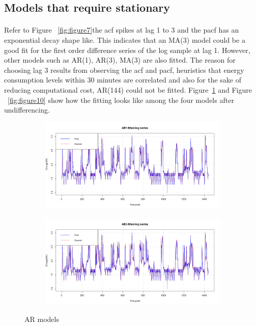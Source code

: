 \documentclass[12pt]{article}
\begin{document}
\subsection{Models that require stationary}
\paragraph{}
Refer to Figure ~\ref{fig:figure7}the acf spikes at lag 1 to 3 and the pacf has an exponential decay shape like. This indicates that an MA(3) model could be a good fit for the first order difference series of the log sample at lag 1. However, other models such as AR(1), AR(3), MA(3) are also fitted. The reason for choosing lag 3 results from observing the acf and pacf, heuristics that energy consumption levels within 30 minutes are correlated and also for the sake of reducing computational cost, AR(144) could not be fitted. Figure~\ref{fig:figure9}  and Figure ~\ref{fig:figure10}  show how the fitting looks like among the four models after undifferencing.
\begin{figure}[H]
  \centering
  \begin{subfigure}[b]{0.9\linewidth}
    \includegraphics[width=\linewidth]{figure9-1.png}
  \end{subfigure}
  \begin{subfigure}[b]{0.9\linewidth}
    \includegraphics[width=\linewidth]{figure9-2.png}
  \end{subfigure}
  \caption{AR models}
  \label{fig:figure9}
\end{figure}
\end{document}
